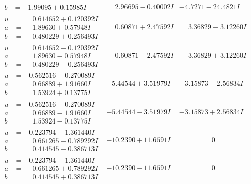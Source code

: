 \documentclass[1p]{elsarticle_modified}
\theoremstyle{definition}
\begin{document}
$$\begin{array}{c|c|c}
\begin{aligned}
b &= -1.99095 + 0.15985 I\end{aligned}
 & \phantom{-}2.96695 - 0.40002 I & -4.7271 - 24.4821 I \\ \hline\begin{aligned}
u &= \phantom{-}0.614652 + 0.120392 I \\
a &= \phantom{-}1.89630 + 0.57948 I \\
b &= \phantom{-}0.480229 + 0.256493 I\end{aligned}
 & \phantom{-}0.60871 + 2.47592 I & \phantom{-}3.36829 - 3.12260 I \\ \hline\begin{aligned}
u &= \phantom{-}0.614652 - 0.120392 I \\
a &= \phantom{-}1.89630 - 0.57948 I \\
b &= \phantom{-}0.480229 - 0.256493 I\end{aligned}
 & \phantom{-}0.60871 - 2.47592 I & \phantom{-}3.36829 + 3.12260 I \\ \hline\begin{aligned}
u &= -0.562516 + 0.270089 I \\
a &= \phantom{-}0.66889 + 1.91660 I \\
b &= \phantom{-}1.53924 + 0.13775 I\end{aligned}
 & -5.44544 + 3.51979 I & -3.15873 - 2.56834 I \\ \hline\begin{aligned}
u &= -0.562516 - 0.270089 I \\
a &= \phantom{-}0.66889 - 1.91660 I \\
b &= \phantom{-}1.53924 - 0.13775 I\end{aligned}
 & -5.44544 - 3.51979 I & -3.15873 + 2.56834 I \\ \hline\begin{aligned}
u &= -0.223794 + 1.361440 I \\
a &= \phantom{-}0.661265 - 0.789292 I \\
b &= \phantom{-}0.414545 - 0.386713 I\end{aligned}
 & -10.2390 + 11.6591 I & \phantom{-0.000000 } 0 \\ \hline\begin{aligned}
u &= -0.223794 - 1.361440 I \\
a &= \phantom{-}0.661265 + 0.789292 I \\
b &= \phantom{-}0.414545 + 0.386713 I\end{aligned}
 & -10.2390 - 11.6591 I & \phantom{-0.000000 } 0 \\ \hline\begin{aligned}

\end{aligned}
\end{array}$$
\end{document}
